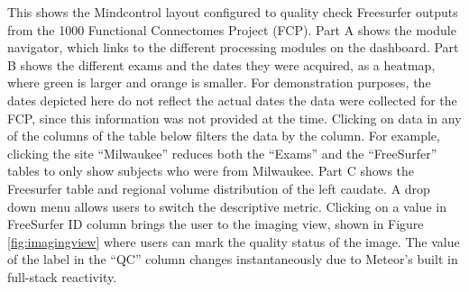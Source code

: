\label{fig:dashboard}

This shows the Mindcontrol layout configured to quality check Freesurfer outputs from the 1000 Functional Connectomes Project (FCP). Part A shows the module navigator, which links to the different processing modules on the dashboard. Part B shows the different exams and the dates they were acquired, as a heatmap, where green is larger and orange is smaller. For demonstration purposes, the dates depicted here do not reflect the actual dates the data were collected for the FCP, since this information was not provided at the time. Clicking on data in any of the columns of the table below filters the data by the column. For example, clicking the site ``Milwaukee'' reduces both the ``Exams'' and the ``FreeSurfer'' tables to only show subjects who were from Milwaukee. Part C shows the Freesurfer table and regional volume distribution of the left caudate. A drop down menu allows users to switch the descriptive metric. Clicking on a value in FreeSurfer ID column brings the user to the imaging view, shown in Figure \ref{fig:imagingview} where users can mark the quality status of the image. The value of the label in the ``QC'' column changes instantaneously due to Meteor's built in full-stack reactivity. 